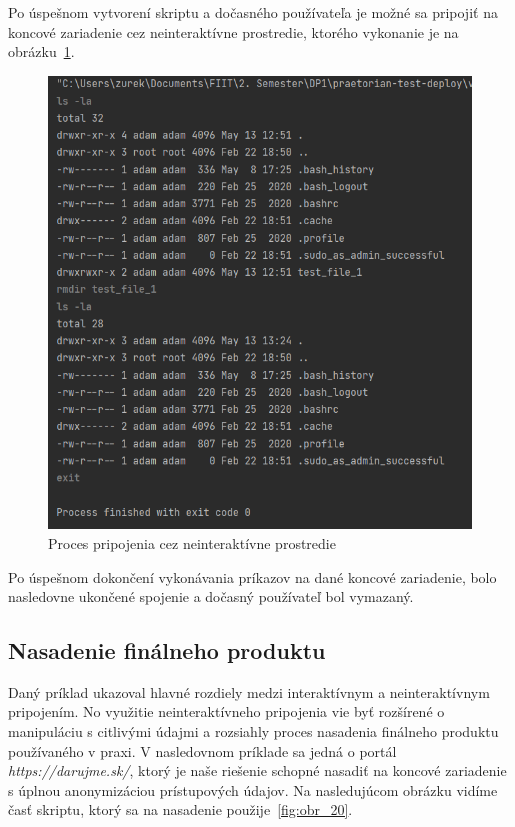 Po úspešnom vytvorení skriptu a dočasného používateľa je možné sa pripojiť na koncové zariadenie cez neinteraktívne prostredie,
ktorého vykonanie je na obrázku~\ref{fig:obr_19}.

\begin{figure}[H]
\begin{center}\includegraphics[width=\textwidth,height=12cm,keepaspectratio=true]{assets/non_interactive_session.png}\end{center}
\caption[Proces pripojenia cez neinteraktívne prostredie]{Proces pripojenia cez neinteraktívne prostredie}\label{fig:obr_19}
\end{figure}

Po úspešnom dokončení vykonávania príkazov na dané koncové zariadenie, bolo nasledovne ukončené spojenie a dočasný používateľ
bol vymazaný.

\subsection{Nasadenie finálneho produktu}\label{subsec:nasadenie-finalneho-produktu}

Daný príklad ukazoval hlavné rozdiely medzi interaktívnym a neinteraktívnym pripojením. No využitie neinteraktívneho pripojenia
vie byť rozšírené o manipuláciu s citlivými údajmi a rozsiahly proces nasadenia finálneho produktu používaného v praxi.
V nasledovnom príklade sa jedná o portál \emph{https://darujme.sk/}, ktorý je naše riešenie schopné nasadiť na koncové zariadenie
s úplnou anonymizáciou prístupových údajov. Na nasledujúcom obrázku vidíme časť skriptu, ktorý sa na nasadenie použije~\ref{fig:obr_20}.

